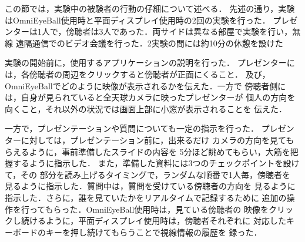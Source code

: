 この節では，実験中の被験者の行動の仔細について述べる．
先述の通り，実験はOmniEyeBall使用時と平面ディスプレイ使用時の2回の実験を行った．
プレゼンターは1人で，傍聴者は3人であった．両サイドは異なる部屋で実験を行い，無線
遠隔通信でのビデオ会議を行った．2実験の間には約10分の休憩を設けた

実験の開始前に，使用するアプリケーションの説明を行った．
プレゼンターには，各傍聴者の周辺をクリックすると傍聴者が正面にくること．
及び，OmniEyeBallでどのように映像が表示されるかを伝えた．一方で
傍聴者側には，自身が見られていると全天球カメラに映ったプレゼンターが
個人の方向を向くこと，それ以外の状況では画面上部に小窓が表示されることを
伝えた．

一方で，プレゼンテーションや質問についても一定の指示を行った．
プレゼンターに対しては，プレゼンテーション前に，出来るだけ
カメラの方向を見てもらえるように，事前準備したスライドの内容を
5分ほど眺めてもらい，大筋を把握するように指示した．
また，準備した資料には3つのチェックポイントを設けて，その
部分を読み上げるタイミングで，ランダムな順番で1人毎，傍聴者を
見るように指示した．質問中は，質問を受けている傍聴者の方向を
見るように指示した．さらに，誰を見ていたかをリアルタイムで記録するために
追加の操作を行ってもらった．OmniEyeBall使用時は，見ている傍聴者の
映像をクリックし続けるように，平面ディスプレイ使用時は，傍聴者それぞれに
対応したキーボードのキーを押し続けてもらうことで視線情報の履歴を
録った．


